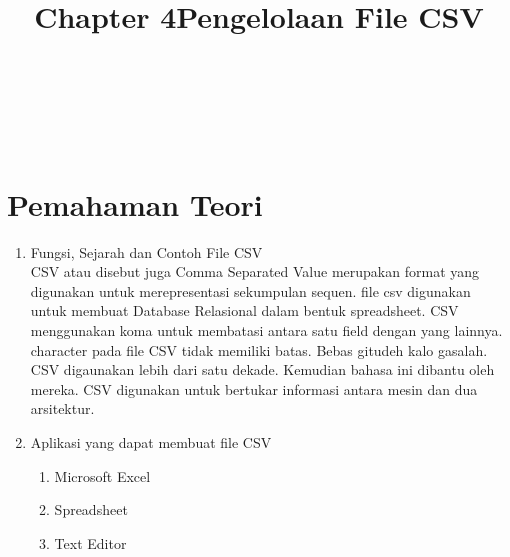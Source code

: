 \begin{center}
\title{\LARGE\bf Chapter 4}\\
\title{\LARGE \bf Pengelolaan File CSV}\\
\end{center}

\appendix
\section{Pemahaman Teori}

\begin{enumerate}
\item Fungsi, Sejarah dan Contoh File CSV\\
CSV atau disebut juga Comma Separated Value merupakan format yang digunakan untuk merepresentasi sekumpulan sequen. file csv digunakan untuk membuat Database Relasional dalam bentuk spreadsheet. CSV menggunakan koma untuk membatasi antara satu field dengan yang lainnya. character pada file CSV tidak memiliki batas. Bebas gitudeh kalo gasalah.\\
CSV digaunakan lebih dari  satu dekade. Kemudian bahasa ini dibantu oleh mereka. CSV digunakan untuk bertukar informasi antara mesin dan dua arsitektur.\\

\item Aplikasi yang dapat membuat file CSV
\begin {enumerate}
\item Microsoft Excel
\item Spreadsheet
\item Text Editor
\end {enumerate}



\end{enumerate}
